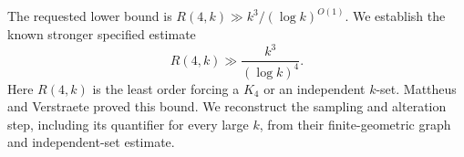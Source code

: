 The requested lower bound is $R(4,k)\gg k^3/(\log k)^{O(1)}$.
We establish the known stronger specified estimate
\[
 R(4,k)\gg\frac{k^3}{(\log k)^4}.
\]
Here $R(4,k)$ is the least order forcing a $K_4$ or an independent
$k$-set. Mattheus and Verstraete proved this bound. We reconstruct the
sampling and alteration step, including its quantifier for every large
$k$, from their finite-geometric graph and independent-set estimate.
